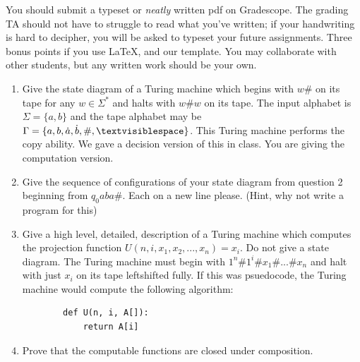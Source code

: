 \documentclass[11pt]{article}
\begin{document}

You should submit a typeset or \emph{neatly} written pdf on Gradescope.  The grading TA should not have to struggle to read what you've written; if your handwriting is hard to decipher, you will be asked to typeset your future assignments. Three bonus points if you use \LaTeX, and our template. You may collaborate with other students, but any written work should be your own. 

\begin{enumerate}
    \item Give the state diagram of a Turing machine which begins with $w\#$ on its tape for any $w \in \Sigma^*$ and halts with $w\#w$ on its tape. The input alphabet is $\Sigma = \{a,b\}$ and the tape alphabet may be $\Gamma = \{a,b,\dot{a}, \dot{b},\#,\textvisiblespace\}$. This Turing machine performs the copy ability. We gave a decision version of this in class. You are giving the computation version. 

    \item Give the sequence of configurations of your state diagram from question 2 beginning from $q_0aba\#$. Each on a new line please. (Hint, why not write a program for this)
    
    \item Give a high level, detailed, description of a Turing machine which computes the projection function $U(n,i,x_1,x_2,...,x_n) = x_i$. Do not give a state diagram. The Turing machine must begin with $1^n \# 1^i \# x_1 \# ... \# x_n$ and halt with just $x_i$ on its tape leftshifted fully. If this was psuedocode, the Turing machine would compute the following algorithm:
    \begin{verbatim}
        def U(n, i, A[]):
            return A[i]
    \end{verbatim}

    \item Prove that the computable functions are closed under composition. 
\end{enumerate}
\end{document}
